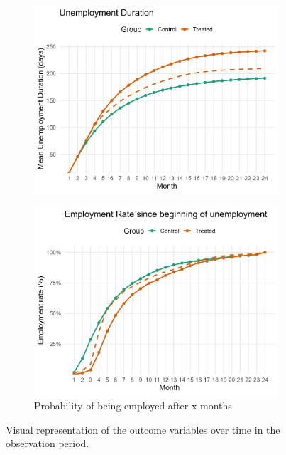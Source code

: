 \documentclass{scrartcl}
\begin{document}
\begin{figure}[h!]
  \centering
  \begin{subfigure}[t]{0.48\textwidth}
    \centering
    \includegraphics[width=\linewidth]{output/figures/final_unemployment_duration_over_time.jpg}
    \caption{}
    \label{fig:duration_overtime}
  \end{subfigure}
  \hfill
  \begin{subfigure}[t]{0.48\textwidth}
    \centering
    \includegraphics[width=\linewidth]{output/figures/final_employment_rate_over_time.jpg}
    \caption{Probability of being employed after x months}
    \label{fig:employment_overtime}
  \end{subfigure}
  \caption{Visual representation of the outcome variables over time in the observation period.}
  \label{fig:combined_overtime}
\end{figure}
\end{document}
